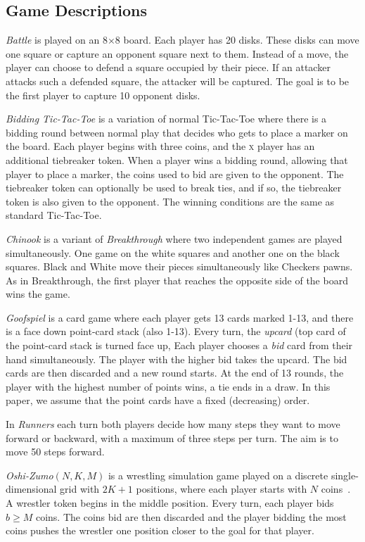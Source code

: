 \documentclass[conference]{IEEEtran}
\begin{document}
\subsection{Game Descriptions}
\label{subsec:games}

\textit{Battle} is played on an 8$\times$8 board. Each player has 20 disks. These disks can move one square or 
capture an opponent square next to them. Instead of a move, the player can choose to defend a square occupied by their 
piece. If an attacker attacks such a defended square, the attacker will be captured. The goal is to be the first player 
to capture 10 opponent disks. 

\textit{Bidding Tic-Tac-Toe} is a variation of normal Tic-Tac-Toe where there is a bidding round between 
normal play that decides who gets to place a marker on the board. Each player begins with three coins, and the 
\textsc{x} player has an additional tiebreaker token. When a player wins a bidding round, allowing that player to 
place a marker, the coins used to bid are given to the opponent. The tiebreaker token can optionally be used to break 
ties, and if so, the tiebreaker token is also given to the opponent. The winning conditions are the same as 
standard Tic-Tac-Toe. 

\textit{Chinook} is a variant of \textit{Breakthrough} where two independent games are played simultaneously. 
One game on the white squares and another one on the black squares. Black and White move their pieces simultaneously 
like Checkers pawns. As in Breakthrough, the first player that reaches the opposite side of the board wins the game. 

\textit{Goofspiel} is a card game where each player gets 13 cards marked 1-13, and there is a face down 
point-card stack (also 1-13). Every turn, the {\it upcard} (top card of the point-card stack is turned face up, 
Each player chooses a {\it bid} card from their hand simultaneously. 
The player with the higher bid takes the upcard. The bid cards are then discarded and a new round starts. 
At the end of 13 rounds, the player with the highest number of points wins, a tie ends in a draw.
In this paper, we assume that the point cards have a fixed (decreasing) order. 

In \textit{Runners} each turn both players decide how many steps they want to move forward or backward, with a maximum of three steps per turn. The aim is to move 50 steps forward.

\textit{Oshi-Zumo}$(N,K,M)$ is a wrestling simulation game played on a discrete single-dimensional grid with 
$2K+1$ positions, where each player starts with $N$ coins~\cite{Buro03OshiZumo}. A wrestler token begins in the middle 
position. Every turn, 
each player bids $b \ge M$ coins. The coins bid are then discarded and the player bidding the most coins pushes the 
wrestler one position closer to the goal for that player. 
\end{document}
